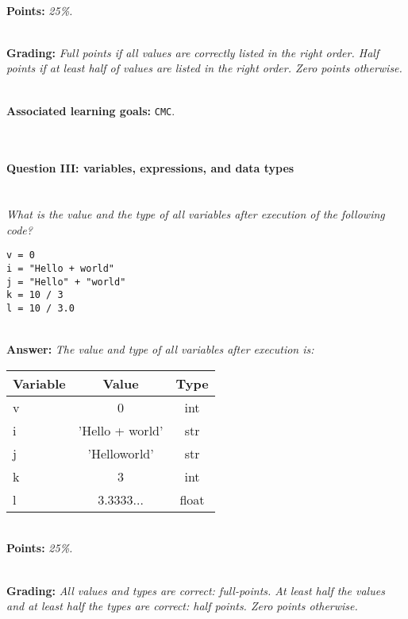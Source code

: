 \ \\

\textbf{Points:} \textit{25\%.}

\ \\ 

\textbf{Grading:} \textit{Full points if all values are correctly listed in the right order. Half points if at least half of values are listed in the right order. Zero points otherwise.}

\ \\ 

\textbf{Associated learning goals:} \texttt{CMC}.

\ \\ 

\paragraph{Question III: variables, expressions, and data types}

\ \\ 

\textit{What is the value and the type of all variables after execution of the following code?}
\begin{lstlisting}
v = 0
i = "Hello + world"
j = "Hello" + "world"
k = 10 / 3
l = 10 / 3.0
\end{lstlisting}

\ \\ 

\textbf{Answer:} \textit{The value and type of all variables after execution is:}

\begin{tabular}{| l | c | c | }
\hline
\textbf{Variable} & \textbf{Value} & \textbf{Type} \\
\hline
v & 0 & int \\
\hline
i & 'Hello + world' & str \\
\hline
j & 'Helloworld' & str \\
\hline
k & 3 & int \\
\hline
l & 3.3333$\dots$ & float \\
\hline
\end{tabular}

\ \\ 

\textbf{Points:} \textit{25\%.}

\ \\ 

\textbf{Grading:} \textit{All values and types are correct: full-points. At least half the values and at least half the types are correct: half points. Zero points otherwise.}

